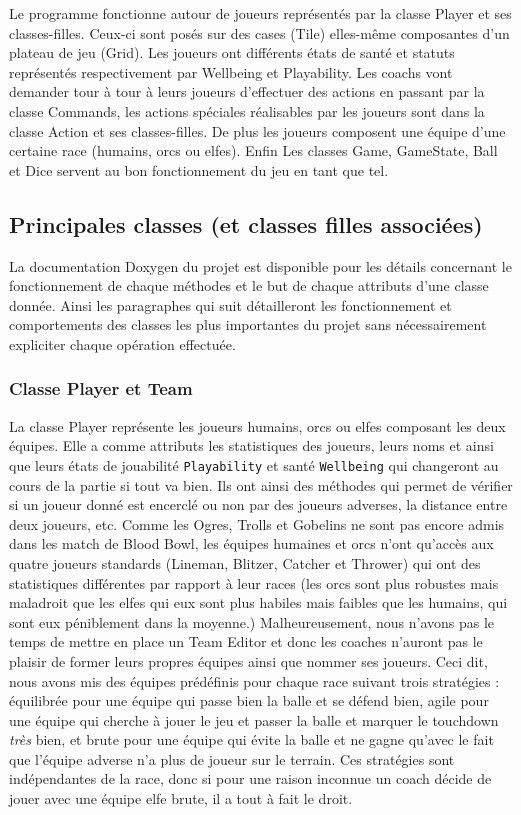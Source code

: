 \documentclass{article}
\newcommand{\info}{\texttt}
\begin{document}
        Le programme fonctionne autour de joueurs représentés par la classe Player et ses classes-filles. Ceux-ci sont posés sur des cases (Tile) elles-même composantes d'un plateau de jeu (Grid). Les joueurs ont différents états de santé et statuts représentés respectivement par Wellbeing et Playability. Les coachs vont demander tour à tour à leurs joueurs d'effectuer des actions en passant par la classe Commands, les actions spéciales réalisables par les joueurs sont dans la classe Action et ses classes-filles. De plus les joueurs composent une équipe d'une certaine race (humains, orcs ou elfes). Enfin Les classes Game, GameState, Ball et Dice servent au bon fonctionnement du jeu en tant que tel.

    \subsection{Principales classes (et classes filles associées)}
        
        La documentation Doxygen du projet est disponible pour les détails concernant le fonctionnement de chaque méthodes et le but de chaque attributs d'une classe donnée. Ainsi les paragraphes qui suit détailleront les fonctionnement et comportements des classes les plus importantes du projet sans nécessairement expliciter chaque opération effectuée.
        
        \subsubsection{Classe Player et Team}
        
            La classe Player représente les joueurs humains, orcs ou elfes composant les deux équipes. Elle a comme attributs les statistiques des joueurs, leurs noms et ainsi que leurs états de jouabilité \info{Playability} et santé \info{Wellbeing} qui changeront au cours de la partie si tout va bien. Ils ont ainsi des méthodes qui permet de vérifier si un joueur donné est encerclé ou non par des joueurs adverses, la distance entre deux joueurs, etc. Comme les Ogres, Trolls et Gobelins ne sont pas encore admis dans les match de Blood Bowl, les équipes humaines et orcs n'ont qu'accès aux quatre joueurs standards (Lineman, Blitzer, Catcher et Thrower) qui ont des statistiques différentes par rapport à leur races (les orcs sont plus robustes mais maladroit que les elfes qui eux sont plus habiles mais faibles que les humains, qui sont eux péniblement dans la moyenne.) Malheureusement, nous n'avons pas le temps de mettre en place un Team Editor et donc les coaches n'auront pas le plaisir de former leurs propres équipes ainsi que nommer ses joueurs. Ceci dit, nous avons mis des équipes prédéfinis pour chaque race suivant trois stratégies : équilibrée pour une équipe qui passe bien la balle et se défend bien, agile pour une équipe qui cherche à jouer le jeu et passer la balle et marquer le touchdown \textit{très} bien, et brute pour une équipe qui évite la balle et ne gagne qu'avec le fait que l'équipe adverse n'a plus de joueur sur le terrain. Ces stratégies sont indépendantes de la race, donc si pour une raison inconnue un coach décide de jouer avec une équipe elfe brute, il a tout à fait le droit. 
        
\end{document}
